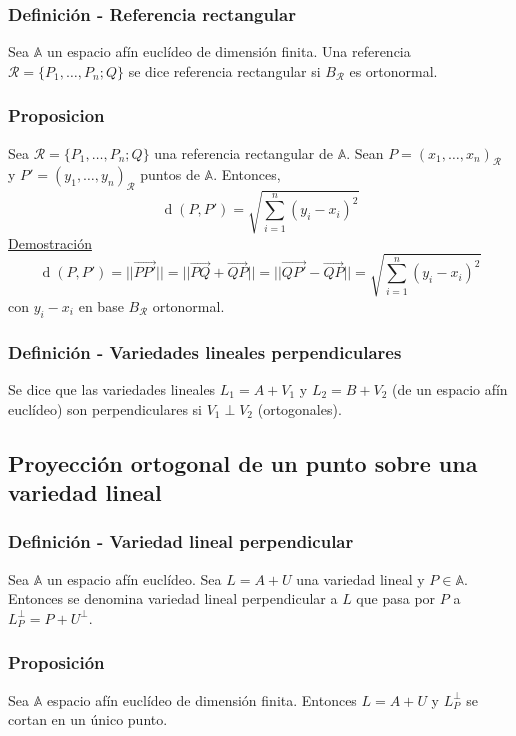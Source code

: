 \documentclass[12pt, a4paper, ones, notitlepage, openany,titlepage]{article}
\newcommand{\demostracion}{\noindent\underline{Demostración}}
\newcommand{\distancia}[1]{\operatorname{d}(#1)}
\begin{document}
\subsubsection{Definición - Referencia rectangular}
Sea $\mathbb{A}$ un espacio afín euclídeo de dimensión finita. Una referencia $\mathcal{R} = \{P_1,\ldots,P_n;Q\}$ se dice referencia rectangular si $B_\mathcal{R}$ es ortonormal.

\subsubsection{Proposicion}
Sea $\mathcal{R} = \{P_1,\ldots,P_n;Q\}$ una referencia rectangular de $\mathbb{A}$. Sean $P = (x_1, \ldots, x_n)_\mathcal{R}$ y $P' = (y_1, \ldots, y_n)_\mathcal{R}$ puntos de $\mathbb{A}$. Entonces,
$$
\distancia{P,P'} = \sqrt{\sum_{i = 1}^{n} (y_i - x_i)^2}
$$
\demostracion
$$
\distancia{P,P'} = || \overrightarrow{PP'} || = ||\overrightarrow{PQ} + \overrightarrow{QP}|| = ||\overrightarrow{QP'} - \overrightarrow{QP}|| = \sqrt{\sum_{i = 1}^{n}(y_i - x_i)^2}
$$
con $y_i - x_i$ en base $B_\mathcal{R}$ ortonormal.

\subsubsection{Definición - Variedades lineales perpendiculares}
Se dice que las variedades lineales $L_1 = A + V_1$ y $L_2 = B + V_2$ (de un espacio afín euclídeo) son perpendiculares si $V_1 \perp V_2$ (ortogonales).

\subsection{Proyección ortogonal de un punto sobre una variedad lineal}

\subsubsection{Definición - Variedad lineal perpendicular}
Sea $\mathbb{A}$ un espacio afín euclídeo. Sea $L = A + U$ una variedad lineal y $P \in \mathbb{A}$. Entonces se denomina variedad lineal perpendicular a $L$ que pasa por $P$ a $L_P^\perp = P + U^\perp$.

\subsubsection{Proposición}
Sea $\mathbb{A}$ espacio afín euclídeo de dimensión finita. Entonces $L = A + U$ y $L_P^\perp$ se cortan en un único punto.
\end{document}
